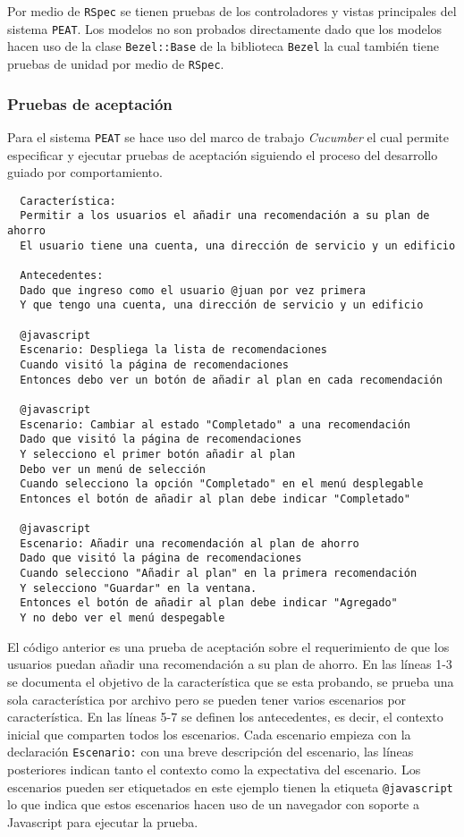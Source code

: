 Por medio de \texttt{RSpec} se tienen pruebas de los controladores y vistas
principales del sistema \texttt{PEAT}. Los modelos no son probados directamente
dado que los modelos hacen uso de la clase \texttt{Bezel::Base} de la biblioteca
\texttt{Bezel} la cual también tiene pruebas de unidad por medio de \texttt{RSpec}.

\subsubsection{Pruebas de aceptación}

Para el sistema \texttt{PEAT} se hace uso del marco de trabajo \textit{Cucumber}
el cual permite especificar y ejecutar pruebas de aceptación siguiendo el proceso
del desarrollo guiado por comportamiento.

\begin{lstlisting}
  Característica:
  Permitir a los usuarios el añadir una recomendación a su plan de ahorro
  El usuario tiene una cuenta, una dirección de servicio y un edificio

  Antecedentes:
  Dado que ingreso como el usuario @juan por vez primera
  Y que tengo una cuenta, una dirección de servicio y un edificio

  @javascript
  Escenario: Despliega la lista de recomendaciones
  Cuando visitó la página de recomendaciones
  Entonces debo ver un botón de añadir al plan en cada recomendación

  @javascript
  Escenario: Cambiar al estado "Completado" a una recomendación
  Dado que visitó la página de recomendaciones
  Y selecciono el primer botón añadir al plan
  Debo ver un menú de selección
  Cuando selecciono la opción "Completado" en el menú desplegable
  Entonces el botón de añadir al plan debe indicar "Completado"

  @javascript
  Escenario: Añadir una recomendación al plan de ahorro
  Dado que visitó la página de recomendaciones
  Cuando selecciono "Añadir al plan" en la primera recomendación
  Y selecciono "Guardar" en la ventana.
  Entonces el botón de añadir al plan debe indicar "Agregado"
  Y no debo ver el menú despegable
\end{lstlisting}

El código anterior es una prueba de aceptación sobre el requerimiento de que los
usuarios puedan añadir una recomendación a su plan de ahorro.
En las líneas 1-3 se documenta el objetivo de la característica que se esta
probando, se prueba una sola característica por archivo pero se pueden tener
varios escenarios por característica. En las líneas 5-7 se definen
los antecedentes, es decir, el contexto inicial que comparten todos los
escenarios. Cada escenario empieza con la declaración \texttt{Escenario:}
con una breve descripción del escenario, las líneas posteriores indican
tanto el contexto como la expectativa del escenario. Los escenarios
pueden ser etiquetados en este ejemplo tienen la etiqueta \texttt{@javascript}
lo que indica que estos escenarios hacen uso de un navegador con soporte
a Javascript para ejecutar la prueba.

